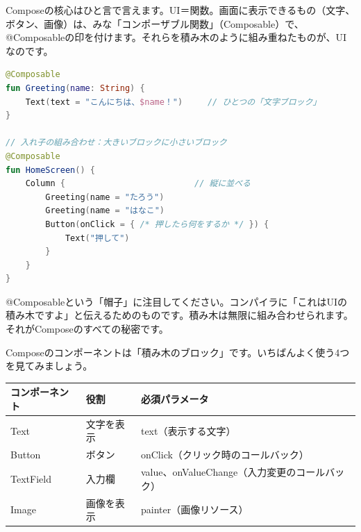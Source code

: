 


Composeの核心はひと言で言えます。UI＝関数。画面に表示できるもの（文字、ボタン、画像）は、みな「コンポーザブル関数」（Composable）で、@Composableの印を付けます。それらを積み木のように組み重ねたものが、UIなのです。

\begin{lstlisting}[language=Kotlin]
@Composable
fun Greeting(name: String) {
    Text(text = "こんにちは、$name！")     // ひとつの「文字ブロック」
}

// 入れ子の組み合わせ：大きいブロックに小さいブロック
@Composable
fun HomeScreen() {
    Column {                          // 縦に並べる
        Greeting(name = "たろう")
        Greeting(name = "はなこ")
        Button(onClick = { /* 押したら何をするか */ }) {
            Text("押して")
        }
    }
}
\end{lstlisting}

@Composableという「帽子」に注目してください。コンパイラに「これはUIの積み木ですよ」と伝えるためのものです。積み木は無限に組み合わせられます。それがComposeのすべての秘密です。


Composeのコンポーネントは「積み木のブロック」です。いちばんよく使う4つを見てみましょう。

\begin{center}
\begin{tabularx}{\linewidth}{|X|X|X|}
\hline
\textbf{コンポーネント} & \textbf{役割} & \textbf{必須パラメータ} \tabularnewline
\hline
Text & 文字を表示 & text（表示する文字） \tabularnewline
Button & ボタン & onClick（クリック時のコールバック） \tabularnewline
TextField & 入力欄 & value、onValueChange（入力変更のコールバック） \tabularnewline
Image & 画像を表示 & painter（画像リソース） \tabularnewline
\hline
\end{tabularx}
\end{center}

